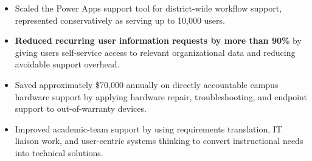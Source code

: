 \begin{minipage}[t]{20cm}
\begin{minipage}[t]{9.75cm}
\begin{itemize}
      \item Scaled the Power Apps support tool for district-wide workflow support, represented conservatively as serving up to 10,000 users.
      \item \textbf{Reduced recurring user information requests by more than 90\%} by giving users self-service access to relevant organizational data and reducing avoidable support overhead.
      \item Saved approximately \$70,000 annually on directly accountable campus hardware support by applying hardware repair, troubleshooting, and endpoint support to out-of-warranty devices.
      \item Improved academic-team support by using requirements translation, IT liaison work, and user-centric systems thinking to convert instructional needs into technical solutions.
    \end{itemize}
  \end{minipage}%
\end{minipage}


